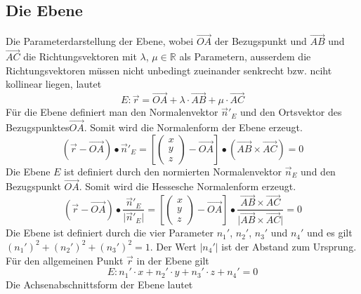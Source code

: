 \subsection{Die Ebene}
Die Parameterdarstellung der Ebene, wobei $\overrightarrow{OA}$ der Bezugspunkt und $\overrightarrow{AB}$ und $\overrightarrow{AC}$ die Richtungsvektoren mit $\lambda$, $\mu\in\mathbb{R}$ als Parametern, ausserdem die Richtungsvektoren müssen nicht unbedingt zueinander senkrecht bzw. nciht kollinear liegen, lautet
\begin{equation}
\boxed{E:\overrightarrow{r}=\overrightarrow{OA}+\lambda\cdot \overrightarrow{AB}+\mu\cdot \overrightarrow{AC}}
\end{equation}
Für die Ebene definiert man den Normalenvektor $\overrightarrow{n}'_E$ und den Ortsvektor des Bezugspunktes$\overrightarrow{OA}$. Somit wird die Normalenform der Ebene erzeugt.
\begin{equation}
\boxed{\left(\overrightarrow{r}-\overrightarrow{OA}\right)\bullet\overrightarrow{n}'_E=\left[\begin{pmatrix}x\\y\\z\end{pmatrix}-\overrightarrow{OA}\right]\bullet \left(\overrightarrow{AB}\times \overrightarrow{AC}\right)=0}
\end{equation}
Die Ebene $E$ ist definiert durch den normierten Normalenvektor $\overrightarrow{n}_E$ und den Bezugspunkt $\overrightarrow{OA}$. Somit wird die Hessesche Normalenform erzeugt.
\begin{equation} 
\boxed{\left(\overrightarrow{r}-\overrightarrow{OA}\right)\bullet \dfrac{\overrightarrow{n}'_E}{\Big\vert \overrightarrow{n}'_E\Big\vert}=\left[\begin{pmatrix}x\\y\\z\end{pmatrix}-\overrightarrow{OA}\right]\bullet \dfrac{\overrightarrow{AB}\times \overrightarrow{AC}}{\Big\vert\overrightarrow{AB}\times \overrightarrow{AC}\Big\vert}=0}
\end{equation} 
Die Ebene ist definiert durch die vier Parameter $n_1'$, $n_2'$, $n_3'$ und $n_4'$ und es gilt $(n_1')^2+(n_2')^2+(n_3')^2=1$. Der Wert $\vert n_4'\vert$ ist der Abstand zum Ursprung. Für den allgemeinen Punkt $\overrightarrow{r}$ in der Ebene gilt
\begin{equation}
\boxed{E:n_1'\cdot x+n_2'\cdot y+n_3'\cdot z+n_4'=0}
\end{equation}
Die Achsenabschnittsform der Ebene lautet
